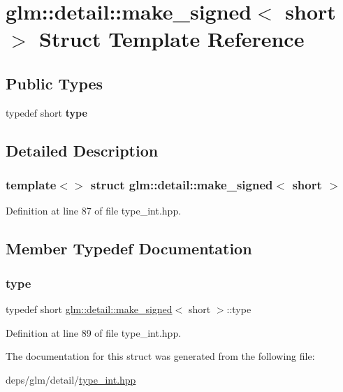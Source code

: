 \hypertarget{structglm_1_1detail_1_1make__signed_3_01short_01_4}{}\section{glm\+:\+:detail\+:\+:make\+\_\+signed$<$ short $>$ Struct Template Reference}
\label{structglm_1_1detail_1_1make__signed_3_01short_01_4}
\subsection*{Public Types}
\begin{DoxyCompactItemize}
\item 
\mbox{\label{structglm_1_1detail_1_1make__signed_3_01short_01_4_a9488d8ffbd34998675456fa6d1143989}} 
typedef short {\bfseries type}
\end{DoxyCompactItemize}


\subsection{Detailed Description}
\subsubsection*{template$<$$>$\newline
struct glm\+::detail\+::make\+\_\+signed$<$ short $>$}



Definition at line 87 of file type\+\_\+int.\+hpp.



\subsection{Member Typedef Documentation}
\mbox{\label{structglm_1_1detail_1_1make__signed_3_01short_01_4_a9488d8ffbd34998675456fa6d1143989}} 
\subsubsection{\texorpdfstring{type}{type}}
{\footnotesize\ttfamily typedef short \hyperlink{structglm_1_1detail_1_1make__signed}{glm\+::detail\+::make\+\_\+signed}$<$ short $>$\+::type}



Definition at line 89 of file type\+\_\+int.\+hpp.



The documentation for this struct was generated from the following file\+:\begin{DoxyCompactItemize}
\item 
deps/glm/detail/\hyperlink{type__int_8hpp}{type\+\_\+int.\+hpp}\end{DoxyCompactItemize}
